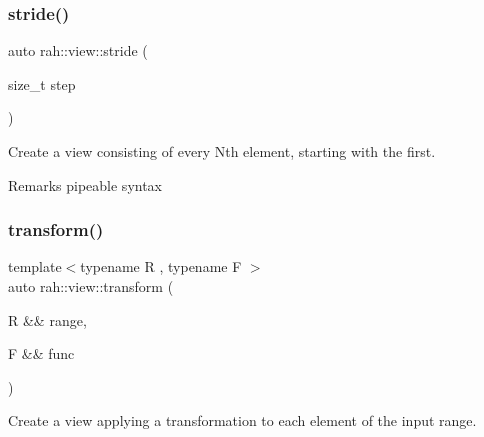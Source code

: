 \subsubsection{\texorpdfstring{stride()}{stride()}\hspace{0.1cm}{\footnotesize\ttfamily [2/2]}}
{\footnotesize\ttfamily auto rah\+::view\+::stride (\begin{DoxyParamCaption}\item[{size\+\_\+t}]{step }\end{DoxyParamCaption})}



Create a view consisting of every Nth element, starting with the first. 

\begin{DoxyRemark}{Remarks}
pipeable syntax
\end{DoxyRemark}

\begin{DoxyCodeInclude}{0}
\end{DoxyCodeInclude}
\mbox{\label{namespacerah_1_1view_ad8750f5c95edcf4f26b0a1c1eec3d676}} 
\subsubsection{\texorpdfstring{transform()}{transform()}\hspace{0.1cm}{\footnotesize\ttfamily [1/2]}}
{\footnotesize\ttfamily template$<$typename R , typename F $>$ \\
auto rah\+::view\+::transform (\begin{DoxyParamCaption}\item[{R \&\&}]{range,  }\item[{F \&\&}]{func }\end{DoxyParamCaption})}



Create a view applying a transformation to each element of the input range. 


